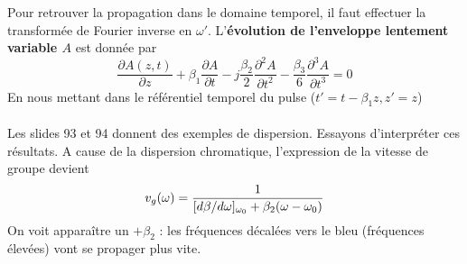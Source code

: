 	Pour retrouver la propagation dans le domaine temporel, il faut effectuer la transformée de 
	Fourier inverse en $\omega'$. L'\textbf{évolution de l'enveloppe lentement variable $A$} est
	donnée par 
	\begin{equation}
	\frac{{\partial A(z,t)}}{{\partial z}} + {\beta _1}\frac{{\partial A}}{{\partial t}} - j\frac{{{\beta _2}}}{2}\frac{{{\partial ^2}A}}{{\partial {t^2}}} - \frac{{{\beta _3}}}{6}\frac{{{\partial ^3}A}}{{\partial {t^3}}} = 0
	\end{equation}
	En nous mettant dans le référentiel temporel du pulse ($t'=t-\beta_1z, z'=z$)\\
	
	\ \\
	
	Les slides 93 et 94 donnent des exemples de dispersion. Essayons d'interpréter ces résultats. 
	A cause de la dispersion chromatique, l'expression de la vitesse de groupe devient
	\begin{equation}
	{v_g}(\omega ) = \frac{1}{{{{[d\beta } \mathord{\left/
 {\vphantom {{[d\beta } {d\omega }}} \right.
 \kern-\nulldelimiterspace} {d\omega }}{]_{{\omega _0}}} + {\beta _2}(\omega  - {\omega _0})}}
	\end{equation}
	On voit apparaître un $+\beta_2$ : les fréquences décalées vers le bleu (fréquences élevées) 
	vont se propager plus vite.
	\newpage
	
